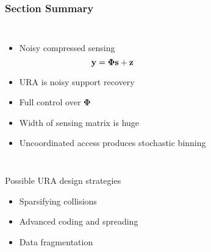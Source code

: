\begin{frame}
\frametitle{Section Summary}
\begin{columns}
  \begin{itemize}
  \item Noisy compressed sensing
  \begin{equation*}
  \mathbf{y} = \boldsymbol{\Phi} \mathbf{s} + \mathbf{z}
  \end{equation*}
  \item URA is noisy support recovery
  \item Full control over $\boldsymbol{\Phi}$
  \item Width of sensing matrix is huge
  \item Uncoordinated access produces stochastic binning
  \end{itemize}
  \hspace{-1cm} \scalebox{0.75}{}
\end{columns}
\vfill
\begin{block}{Possible URA design strategies}
  \begin{itemize}
  \item Sparsifying collisions
  \item Advanced coding and spreading
  \item Data fragmentation
  \end{itemize}
\end{block}
\end{frame}



